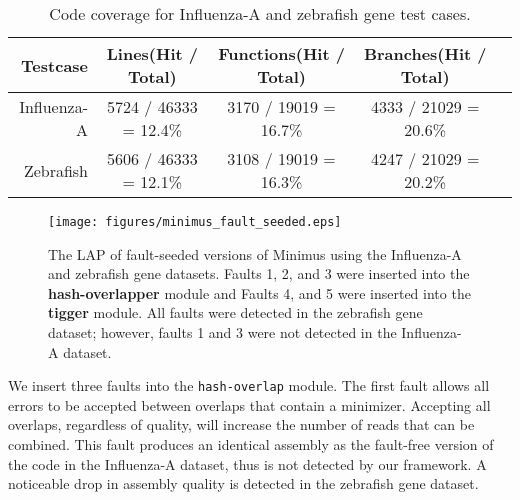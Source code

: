 \renewcommand{\baselinestretch}{1}
\small\normalsize


\begin{table*}[htbp]
\caption{Code coverage for Influenza-A and zebrafish gene test cases.}
\label{Tab:codecoverage}
\begin{center}
\begin{tabular}{r|cccc}
Testcase & Lines(Hit / Total) & Functions(Hit / Total) & Branches(Hit / Total)\\ \hline
Influenza-A & 5724 / 46333 = 12.4\% & 3170 / 19019 = 16.7\% & 4333 / 21029 = 20.6\% \\
Zebrafish & 5606 / 46333 = 12.1\%  & 3108 / 19019 = 16.3\% & 4247 / 21029 = 20.2\% \\
\hline
\end{tabular}
\end{center}
\end{table*}

\renewcommand{\baselinestretch}{2}
\small\normalsize

\begin{figure}[!htb]%
\begin{center}
  \texttt{[image: figures/minimus\_fault\_seeded.eps]}
\end{center}
\renewcommand{\baselinestretch}{1}
\small\normalsize
\begin{quote}
\caption[LAP scores for fault-seeded versions of Minimus]{The LAP of fault-seeded versions of Minimus using the Influenza-A and zebrafish gene datasets.  Faults 1, 2, and 3 were inserted into the \textbf{hash-overlapper} module and Faults 4, and 5 were inserted into the \textbf{tigger} module. All faults were detected in the zebrafish gene dataset; however, faults 1 and 3 were not detected in the Influenza-A dataset.}
\label{fig:minimus_fault_seeded}
\end{quote}
\end{figure}
\renewcommand{\baselinestretch}{2}
\small\normalsize

We insert three faults into the \texttt{hash-overlap} module.
The first fault allows all errors to be accepted between overlaps that contain a minimizer.
Accepting all overlaps, regardless of quality, will increase the number of reads that can be combined.
This fault produces an identical assembly as the fault-free version of the code in the Influenza-A dataset, thus is not detected by our framework.
A noticeable drop in assembly quality is detected in the zebrafish gene dataset.

